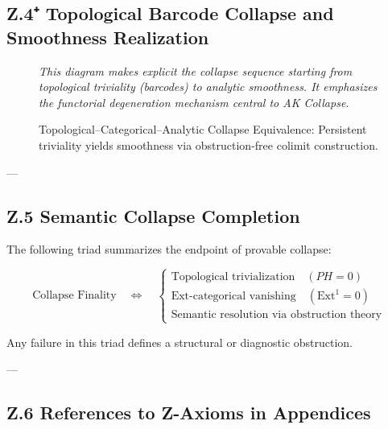 \documentclass[11pt]{article}
\begin{document}
\begin{axiom}
\begin{axiom}
{{\subsection*{Z.4⁺ Topological Barcode Collapse and Smoothness Realization}

\begin{figure}[H]
\centering
{}

\caption{Topological–Categorical–Analytic Collapse Equivalence: Persistent triviality yields smoothness via obstruction-free colimit construction.}

\textit{This diagram makes explicit the collapse sequence starting from topological triviality (barcodes) to analytic smoothness.  
It emphasizes the functorial degeneration mechanism central to AK Collapse.}
\end{figure}

---

\subsection*{Z.5 Semantic Collapse Completion}

The following triad summarizes the endpoint of provable collapse:

\[
\text{Collapse Finality} \quad \Longleftrightarrow \quad
\begin{cases}
\text{Topological trivialization} \quad (PH = 0) \\
\text{Ext-categorical vanishing} \quad (\mathrm{Ext}^1 = 0) \\
\text{Semantic resolution via obstruction theory}
\end{cases}
\]

Any failure in this triad defines a structural or diagnostic obstruction.

---

\subsection*{Z.6 References to Z-Axioms in Appendices}

}}
\end{axiom}
\end{axiom}
\end{document}
